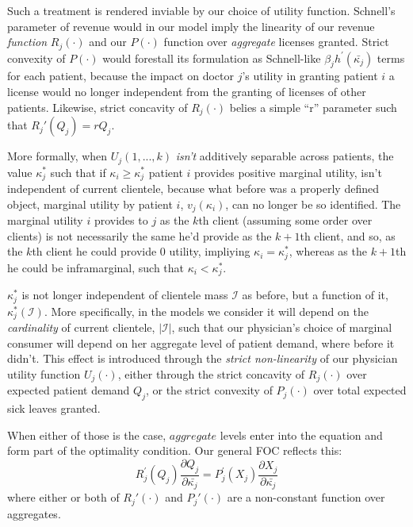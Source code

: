 \documentclass[../main.tex]{subfiles}
\begin{document}
Such a treatment is rendered inviable by our choice of utility function. Schnell's parameter of revenue would in our model imply the linearity of our revenue \textit{function} $R_j(\cdot)$ and our $P(\cdot)$ function over \textit{aggregate} licenses granted. Strict convexity of $P(\cdot)$ would forestall its formulation as Schnell-like $\beta_j h^{\prime}(\bar{\kappa_j})$ terms for each patient, because the impact on doctor $j$'s utility in granting patient $i$ a license would no longer independent from the granting of licenses of other patients. Likewise, strict concavity of $R_j(\cdot)$ belies a simple ``r'' parameter such that $R_j'(Q_j) = r Q_j$.

More formally, when $U_j(1,...,k)$ \textit{isn't} additively separable across patients, the value $\kappa_j^*$ such that if $\kappa_i \geq \kappa_j^*$ patient $i$ provides positive marginal utility, isn’t independent of current clientele, because what before was a properly defined object, marginal utility by patient $i$, $v_j(\kappa_i)$, can no longer be so identified. The marginal utility $i$ provides to $j$ as the $k$th client (assuming some order over clients) is not necessarily the same he’d provide as the $k+1$th client, and so, as the $k$th client he could provide $0$ utility, impliying $\kappa_i = \kappa_j^*$, whereas as the $k + 1$th he could be inframarginal, such that $\kappa_i < \kappa_j^*$.

$\kappa_j^*$ is not longer independent of clientele mass $\mathcal{I}$ as before, but a function of it, $\kappa_j^*(\mathcal{I})$. More specifically, in the models we consider it will depend on the \textit{cardinality} of current clientele, $|\mathcal{I}|$, such that our physician's choice of marginal consumer will depend on her aggregate level of patient demand, where before it didn't. This effect is introduced through the \textit{strict non-linearity} of our physician utility function $U_j(\cdot)$, either through the strict concavity of $R_j(\cdot)$ over expected patient demand $Q_j$, or the strict convexity of $P_j(\cdot)$ over total expected sick leaves granted.

When either of those is the case, $aggregate$ levels enter into the equation and form part of the optimality condition. Our general FOC reflects this:
\begin{equation}
 R_j^{\prime}(Q_j)\frac{\partial Q_j}{\partial\bar{\kappa_j}} = P_j^{\prime}(X_j)\frac{\partial X_j}{\partial \bar{\kappa_j}} 
 \label{eq:apx_foc}
\end{equation}
where either or both of $R_j'(\cdot)$ and $P_j'(\cdot)$ are a non-constant function over aggregates.
\end{document}
